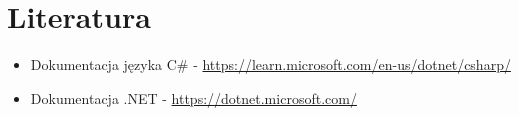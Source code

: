 \chapter{Literatura}
\begin{itemize}
    \item Dokumentacja języka C\# - \url{https://learn.microsoft.com/en-us/dotnet/csharp/}
    \item Dokumentacja .NET - \url{https://dotnet.microsoft.com/}
\end{itemize}